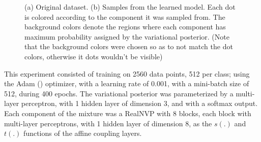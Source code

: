 \begin{figure}[!htb]
  \begin{subfigmatrix}{2}
  \end{subfigmatrix}
    \caption{(a) Original dataset. (b) Samples from the learned model. Each
dot is colored according to the component it was sampled from. The background
colors denote the regions where each component has maximum probability assigned
by the variational posterior. (Note that the background colors were chosen
so as to not match the dot colors, otherwise it dots wouldn't be visible)}
  \label{fig:pinwheel}
\end{figure}

This experiment consisted of training on 2560 data points, 512 per class; using
the Adam (\autocite{adam}) optimizer, with a learning rate of 0.001, with a
mini-batch size of 512, during 400 epochs. The variational posterior was parameterized
by a multi-layer perceptron, with 1 hidden layer of dimension 3, and with a
softmax output. Each component of the mixture was a RealNVP with 8 blocks, each
block with multi-layer perceptrons, with 1 hidden layer of dimension 8, as the
$s(.)$ and $t(.)$ functions of the affine coupling layers.

